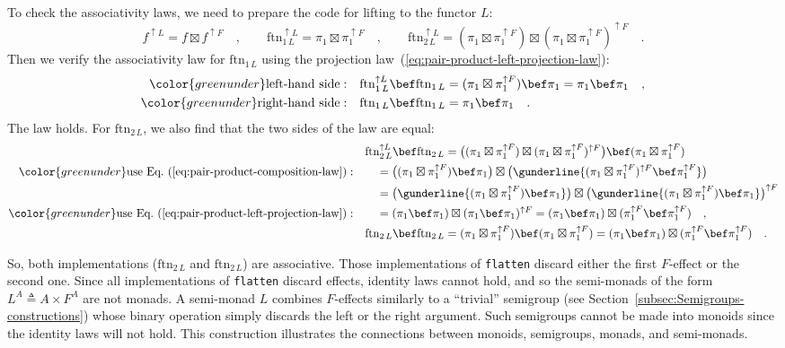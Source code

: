 To check the associativity laws, we need to prepare the code for lifting
to the functor $L$:
\[
f^{\uparrow L}=f\boxtimes f^{\uparrow F}\quad,\quad\quad\text{ftn}_{1\,L}^{\uparrow L}=\pi_{1}\boxtimes\pi_{1}^{\uparrow F}\quad,\quad\quad\text{ftn}_{2\,L}^{\uparrow L}=(\pi_{1}\boxtimes\pi_{1}^{\uparrow F})\boxtimes(\pi_{1}\boxtimes\pi_{1}^{\uparrow F})^{\uparrow F}\quad.
\]
Then we verify the associativity law for $\text{ftn}_{1\,L}$ using
the projection law~(\ref{eq:pair-product-left-projection-law}):
\begin{align*}
{\color{greenunder}\text{left-hand side}:}\quad & \text{ftn}_{1\,L}^{\uparrow L}\bef\text{ftn}_{1\,L}=(\pi_{1}\boxtimes\pi_{1}^{\uparrow F})\bef\pi_{1}=\pi_{1}\bef\pi_{1}\quad,\\
{\color{greenunder}\text{right-hand side}:}\quad & \text{ftn}_{1\,L}\bef\text{ftn}_{1\,L}=\pi_{1}\bef\pi_{1}\quad.
\end{align*}
The law holds. For $\text{ftn}_{2\,L}$, we also find that the two
sides of the law are equal:
\begin{align*}
 & \text{ftn}_{2\,L}^{\uparrow L}\bef\text{ftn}_{2\,L}=\big((\pi_{1}\boxtimes\pi_{1}^{\uparrow F})\boxtimes(\pi_{1}\boxtimes\pi_{1}^{\uparrow F})^{\uparrow F}\big)\bef(\pi_{1}\boxtimes\pi_{1}^{\uparrow F})\\
{\color{greenunder}\text{use Eq.~(\ref{eq:pair-product-composition-law})}:}\quad & \quad=\big((\pi_{1}\boxtimes\pi_{1}^{\uparrow F})\bef\pi_{1}\big)\boxtimes\big(\gunderline{(\pi_{1}\boxtimes\pi_{1}^{\uparrow F})^{\uparrow F}\bef\pi_{1}^{\uparrow F}}\big)\\
 & \quad=\big(\gunderline{(\pi_{1}\boxtimes\pi_{1}^{\uparrow F})\bef\pi_{1}}\big)\boxtimes\big(\gunderline{(\pi_{1}\boxtimes\pi_{1}^{\uparrow F})\bef\pi_{1}}\big)^{\uparrow F}\\
{\color{greenunder}\text{use Eq.~(\ref{eq:pair-product-left-projection-law})}:}\quad & \quad=(\pi_{1}\bef\pi_{1})\boxtimes(\pi_{1}\bef\pi_{1})^{\uparrow F}=(\pi_{1}\bef\pi_{1})\boxtimes(\pi_{1}^{\uparrow F}\bef\pi_{1}^{\uparrow F})\quad,\\
 & \text{ftn}_{2\,L}\bef\text{ftn}_{2\,L}=(\pi_{1}\boxtimes\pi_{1}^{\uparrow F})\bef(\pi_{1}\boxtimes\pi_{1}^{\uparrow F})=(\pi_{1}\bef\pi_{1})\boxtimes(\pi_{1}^{\uparrow F}\bef\pi_{1}^{\uparrow F})\quad.
\end{align*}

So, both implementations ($\text{ftn}_{2\,L}$ and $\text{ftn}_{2\,L}$)
are associative. Those implementations of \lstinline!flatten! discard
either the first $F$-effect or the second one. Since all implementations
of \lstinline!flatten! discard effects, identity laws cannot hold,
and so the semi-monads of the form $L^{A}\triangleq A\times F^{A}$
are not monads. A semi-monad $L$ combines $F$-effects similarly
to a \textsf{``}trivial\textsf{''} semigroup (see Section~\ref{subsec:Semigroups-constructions})
whose binary operation simply discards the left or the right argument.
Such semigroups cannot be made into monoids since the identity laws
will not hold. This construction illustrates the connections between
monoids, semigroups, monads, and semi-monads.

